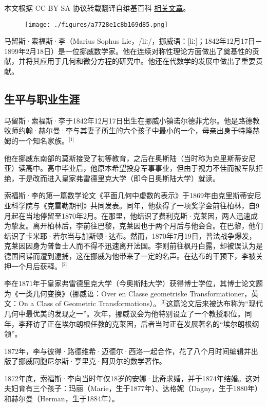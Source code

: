 
本文根据 CC-BY-SA 协议转载翻译自维基百科 \href{https://en.wikipedia.org/wiki/Sophus_Lie}{相关文章}。

\begin{figure}[ht]
\centering
\texttt{[image: ./figures/a7728e1c8b169d85.png]}
\caption{} \label{fig_SFSL_1}
\end{figure}
马留斯·索福斯·李（Marius Sophus Lie，/liː/，挪威语：[liː]；1842年12月17日－1899年2月18日）是一位挪威数学家。他在连续对称性理论方面做出了奠基性的贡献，并将其应用于几何和微分方程的研究中。他还在代数学的发展中做出了重要贡献。
\subsection{生平与职业生涯}
马留斯·索福斯·李于1842年12月17日出生在挪威小镇诺尔德菲尤尔。他是路德教牧师约翰·赫尔曼·李与其妻子所生的六个孩子中最小的一个，母亲出身于特隆赫姆的一个知名家族。\(^\text{[1]}\)

他在挪威东南部的莫斯接受了初等教育，之后在奥斯陆（当时称为克里斯蒂安尼亚）读高中。高中毕业后，他原本希望投身军事事业，但由于视力不佳而被军队拒绝，于是改而进入皇家弗雷德里克大学（即今日奥斯陆大学）就读。

索福斯·李的第一篇数学论文《平面几何中虚数的表示》于1869年由克里斯蒂安尼亚科学院与《克雷勒期刊》共同发表。同年，他获得了一项奖学金前往柏林，自9月起在当地停留至1870年2月。在那里，他结识了费利克斯·克莱因，两人迅速成为挚友。离开柏林后，李前往巴黎，克莱因也于两个月后与他会合。在巴黎，他们结识了卡米耶·若尔当与加斯顿·达布。然而，1870年7月19日，普法战争爆发，克莱因因身为普鲁士人而不得不迅速离开法国。李则前往枫丹白露，却被误认为是德国间谍而遭到逮捕，这在挪威为他带来了一定的名声。在达布的干预下，李被关押一个月后获释。\(^\text{[2]}\)

李在1871年于皇家弗雷德里克大学（今奥斯陆大学）获得博士学位，其博士论文题为《一类几何变换》（挪威语：Over en Classe geometriske Transformationer，英文：On a Class of Geometric Transformations）。\(^\text{[3]}\)这篇论文后来被达布称为“现代几何中最优美的发现之一”。次年，挪威议会为他特别设立了一个教授职位。同年，李拜访了正在埃尔朗根任教的克莱因，后者当时正在发展著名的“埃尔朗根纲领”。

1872年，李与彼得·路德维希·迈德尔·西洛一起合作，花了八个月时间编辑并出版了挪威同胞尼尔斯·亨里克·阿贝尔的数学著作。

1872年底，索福斯·李向当时年仅18岁的安娜·比奇求婚，并于1874年结婚。这对夫妇育有三个孩子：玛丽（Marie，生于1877年）、达格妮（Dagny，生于1880年）和赫尔曼（Herman，生于1884年）。

